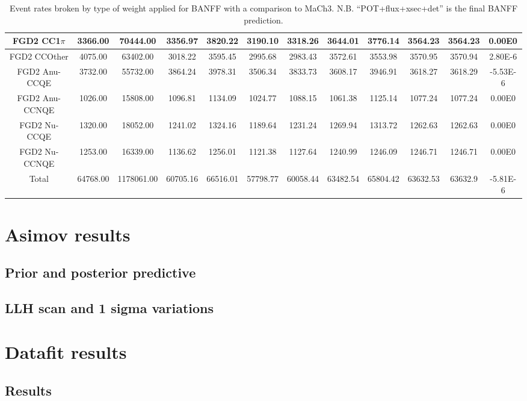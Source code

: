 \begin{sidewaystable}
{\begin{tabular}{| c | c | c | c | c | c | c | c | c | c | c | c |}
			FGD2 CC1$\pi$ &  3366.00 &  70444.00 &  3356.97 &  3820.22 &  3190.10 &  3318.26 &  3644.01 &  3776.14 &  3564.23 & 3564.23 & 0.00E0\\ \hline
			FGD2 CCOther &  4075.00 &  63402.00 &  3018.22 &  3595.45 &  2995.68 &  2983.43 &  3572.61 &  3553.98 &  3570.95 & 3570.94 & 2.80E-6 \\ \hline
			FGD2 Anu-CCQE &  3732.00 &  55732.00 &  3864.24 &  3978.31 &  3506.34 &  3833.73 &  3608.17 &  3946.91 &  3618.27 & 3618.29 & -5.53E-6 \\ \hline
			FGD2 Anu-CCNQE &  1026.00 &  15808.00 &  1096.81 &  1134.09 &  1024.77 &  1088.15 &  1061.38 &  1125.14 &  1077.24 & 1077.24 & 0.00E0 \\ \hline
			FGD2 Nu-CCQE &  1320.00 &  18052.00 &  1241.02 &  1324.16 &  1189.64 &  1231.24 &  1269.94 &  1313.72 &  1262.63 & 1262.63 & 0.00E0 \\ \hline
			FGD2 Nu-CCNQE &  1253.00 &  16339.00 &  1136.62 &  1256.01 &  1121.38 &  1127.64 &  1240.99 &  1246.09 &  1246.71 & 1246.71 & 0.00E0 \\ \hline
			Total &  64768.00 &  1178061.00 &  60705.16 &  66516.01 &  57798.77 &  60058.44 &  63482.54 &  65804.42 &  63632.53 & 63632.9 & -5.81E-6 \\ \hline
		\end{tabular}
	}
	\caption{Event rates broken by type of weight applied for BANFF with a comparison to MaCh3. N.B. ``POT+flux+xsec+det'' is the final BANFF prediction.}
	\label{tab:eventrate}
\end{sidewaystable}

\section{Asimov results}


\subsection{Prior and posterior predictive}

\subsection{LLH scan and 1 sigma variations}

\section{Datafit results}

\subsection{Results}

